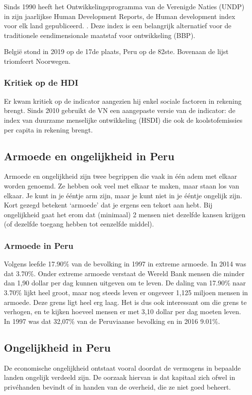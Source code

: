 Sinds 1990 heeft het Ontwikkelingsprogramma van de Verenigde Naties (UNDP) in zijn jaarlijkse Human Development Reports, de Human development index voor elk land gepubliceerd. \autocite{AmbujD.Sagar1997}. Deze index is een belangrijk alternatief voor de traditionele eendimensionale maatstaf voor ontwikkeling (BBP). 

België stond in 2019 op de 17de plaats, Peru op de 82ste. Bovenaan de lijst triomfeert Noorwegen. \autocite{UNDP2019a} 

\subsubsection{Kritiek op de HDI}
Er kwam kritiek op de indicator aangezien hij enkel sociale factoren in rekening brengt. Sinds 2010 gebruikt de VN een aangepaste versie van de indicator: de index van duurzame menselijke ontwikkeling (HSDI) die ook de koolstofemissies per capita in rekening brengt. \autocite{Economie2018}

\subsection{Armoede en ongelijkheid in Peru}
Armoede en ongelijkheid zijn twee begrippen die vaak in één adem met elkaar worden genoemd. Ze hebben ook veel met elkaar te maken, maar staan los van elkaar. Je kunt in je ééntje arm zijn, maar je kunt niet in je ééntje ongelijk zijn. Kort gezegd betekent ‘armoede’ dat je ergens een tekort aan hebt. Bij ongelijkheid gaat het erom dat (minimaal) 2 mensen niet dezelfde kansen krijgen (of dezelfde toegang hebben tot eenzelfde middel). \autocite{Novib2020}

\subsubsection{Armoede in Peru}
Volgens \autocite{OurWorldInData2016} leefde 17.90\% van de bevolking in 1997 in extreme armoede. In 2014 was dat 3.70\%. Onder extreme armoede verstaat de Wereld Bank mensen die minder dan 1,90 dollar per dag kunnen uitgeven om te leven. De daling van 17.90\% naar 3.70\% lijkt heel groot, maar nog steeds leven er ongeveer 1,125 miljoen mensen in armoede. Deze grens ligt heel erg laag. Het is dus ook interessant om die grens te verhogen, en te kijken hoeveel mensen er met 3,10 dollar per dag moeten leven. In 1997 was dat 32,07\% van de Peruviaanse bevolking en in 2016  9.01\%.

\subsection{Ongelijkheid in Peru}
De economische ongelijkheid ontstaat vooral doordat de vermogens in bepaalde landen ongelijk verdeeld zijn. De oorzaak hiervan is dat kapitaal zich ofwel in privéhanden bevindt of in handen van de overheid, die ze niet goed beheert. \autocite{Zucman2018}

